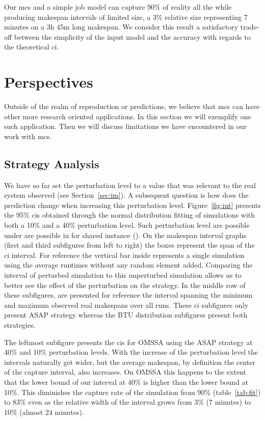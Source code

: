 \documentclass[10pt,conference,compsocconf]{IEEEtran}
\begin{document}
Our \ac{mcs} and a simple job model can capture 90\% of reality all the while
producing makespan intervals of limited size, a 3\% relative size representing 7
minutes on a 3h 45m long makespan. We consider this result a satisfactory
trade-off between the simplicity of the input model and the accuracy with
regards to the theoretical \ac{ci}.


\section{Perspectives}
\label{sec:disc}
Outside of the realm of reproduction or predictions, we believe that \ac{mcs}
can have other more research oriented applications. In this section we will
exemplify one such application. Then we will discuss limitations we have
encountered in our work with \ac{mcs}.

\subsection{Strategy Analysis}\label{sec:sa}

We have so  far set the perturbation level  to a value that was  relevant to the
real system observed  (see Section~\ref{sec:im}).  A subsequent  question is how
does   the  prediction   change   when  increasing   this  perturbation   level.
Figure~\ref{fig:int} presents the 95\% \acp{ci} obtained through the normal
distribution fitting of simulations with both a 10\%
and a 40\% perturbation  level. Such perturbation level are possible under are
possible in for shared instance (\cite{LeitnerC16}). On the makespan interval graphs  (first and third
subfigures  from left  to right)  the boxes  represent the  span of the \ac{ci}
interval. For reference  the vertical bar inside represents  a single simulation
using  the average  runtimes without  any random  element added.   Comparing the
interval of  perturbed simulation  to this unperturbed  simulation allows  us to
better see  the effect of the perturbation on the strategy. In the middle row of
these subfigures, are presented for  reference the interval spanning the minimum
and maximum  observed real  makespans over all  runs.  These  \ac{ci} subfigures
only present ASAP strategy whereas  the BTU distribution subfigures present both
strategies.

The leftmost subfigure presents the \acp{ci} for OMSSA using the ASAP strategy at
40\% and 10\% perturbation levels. With the increase of the perturbation level
the intervals naturally get wider, but the average makespan, by definition the
center of the capture interval, also increases. On OMSSA this happens to the
extent that the lower bound of our interval at 40\% is higher than the lower
bound at 10\%. This diminishes the capture rate of the simulation from 90\%
(table~\ref{tab:fit}) to 83\% even as the relative width of the interval grows
from 3\% (7 minutes) to 10\% (almost 24 minutes).
\end{document}
